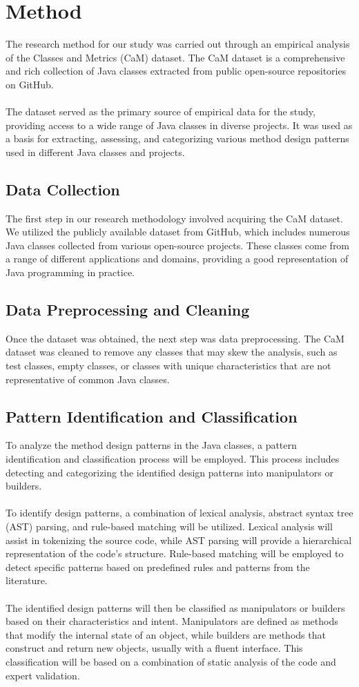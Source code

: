 \documentclass[draft]{article}
\begin{document}
\newpage
\section{Method}
The research method for our study was carried out through an empirical analysis of the Classes and Metrics (CaM) dataset\cite{ref9}. The CaM dataset is a comprehensive and rich collection of Java classes extracted from public open-source repositories on GitHub.\\
~\\
The dataset served as the primary source of empirical data for the study, providing access to a wide range of Java classes in diverse projects. It was used as a basis for extracting, assessing, and categorizing various method design patterns used in different Java classes and projects.
\subsection{Data Collection}
The first step in our research methodology involved acquiring the CaM dataset. We utilized the publicly available dataset from GitHub, which includes numerous Java classes collected from various open-source projects. These classes come from a range of different applications and domains, providing a good representation of Java programming in practice.
\subsection{Data Preprocessing and Cleaning}
Once the dataset was obtained, the next step was data preprocessing. The CaM dataset was cleaned to remove any classes that may skew the analysis, such as test classes, empty classes, or classes with unique characteristics that are not representative of common Java classes.
\subsection{Pattern Identification and Classification}
To analyze the method design patterns in the Java classes, a pattern identification and classification process will be employed. This process includes detecting and categorizing the identified design patterns into manipulators or builders.\\
~\\
To identify design patterns, a combination of lexical analysis, abstract syntax tree (AST) parsing, and rule-based matching will be utilized. Lexical analysis will assist in tokenizing the source code, while AST parsing will provide a hierarchical representation of the code's structure. Rule-based matching will be employed to detect specific patterns based on predefined rules and patterns from the literature.\\
~\\
The identified design patterns will then be classified as manipulators or builders based on their characteristics and intent. Manipulators are defined as methods that modify the internal state of an object, while builders are methods that construct and return new objects, usually with a fluent interface. This classification will be based on a combination of static analysis of the code and expert validation.
\end{document}
